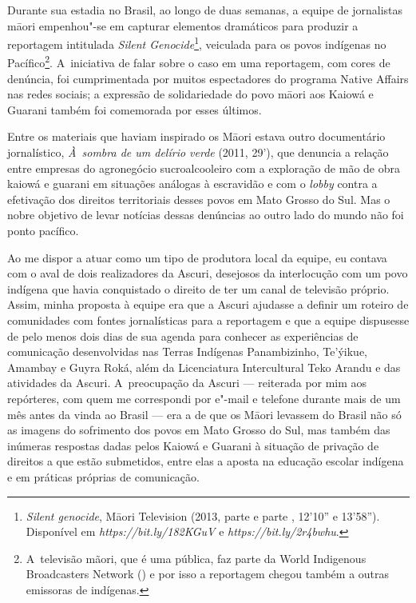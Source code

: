Durante sua estadia no Brasil, ao longo de duas semanas, a equipe de
jornalistas m\=aori empenhou"-se em capturar elementos dramáticos para
produzir a reportagem intitulada \emph{Silent Genocide}\footnote[7]{\emph{Silent
genocide}, M\=aori Television (2013, parte  e parte ,
12'10'' e 13'58''). Disponível em
\emph{https://bit.ly/182KGuV} e \emph{https://bit.ly/2r4bwhu}.},
veiculada para os povos indígenas no Pacífico\footnote[8]{A~televisão
mãori, que é uma  pública, faz parte da World Indigenous Broadcasters
Network () e por isso a reportagem chegou também a outras
emissoras de  indígenas. }. A~iniciativa de falar sobre o caso em uma
reportagem, com cores de denúncia, foi cumprimentada por muitos
espectadores do programa Native Affairs nas redes sociais; a expressão
de solidariedade do povo m\=aori aos Kaiowá e Guarani também foi
comemorada por esses últimos.

Entre os materiais que haviam inspirado os M\=aori estava outro
documentário jornalístico, \emph{À~sombra de um delírio verde} (2011, 29’), que denuncia a relação entre empresas do agronegócio sucroalcooleiro
com a exploração de mão de obra kaiowá e guarani em situações análogas
à escravidão e com o \emph{lobby} contra a efetivação dos direitos
territoriais desses povos em Mato Grosso do Sul. Mas o nobre objetivo
de levar notícias dessas denúncias ao outro lado do mundo não foi ponto
pacífico.

Ao me dispor a atuar como um tipo de produtora local da equipe, eu
contava com o aval de dois realizadores da Ascuri, desejosos da
interlocução com um povo indígena que havia conquistado o direito de
ter um canal de televisão próprio. Assim, minha proposta à equipe era
que a Ascuri ajudasse a definir um roteiro de comunidades com fontes
jornalísticas para a reportagem e que a equipe dispusesse de pelo menos
dois dias de sua agenda para conhecer as experiências de comunicação
desenvolvidas nas Terras Indígenas Panambizinho, Te’ýikue, Amambay e
Guyra Roká, além da Licenciatura Intercultural Teko Arandu e das
atividades da Ascuri. A~preocupação da Ascuri --- reiterada por mim aos
repórteres, com quem me correspondi por e"-mail e telefone durante mais
de um mês antes da vinda ao Brasil --- era a de que os M\=aori levassem
do Brasil não só as imagens do sofrimento dos povos em Mato Grosso do
Sul, mas também das inúmeras respostas dadas pelos Kaiowá e Guarani à
situação de privação de direitos a que estão submetidos, entre elas a
aposta na educação escolar indígena e em práticas próprias de
comunicação. 

